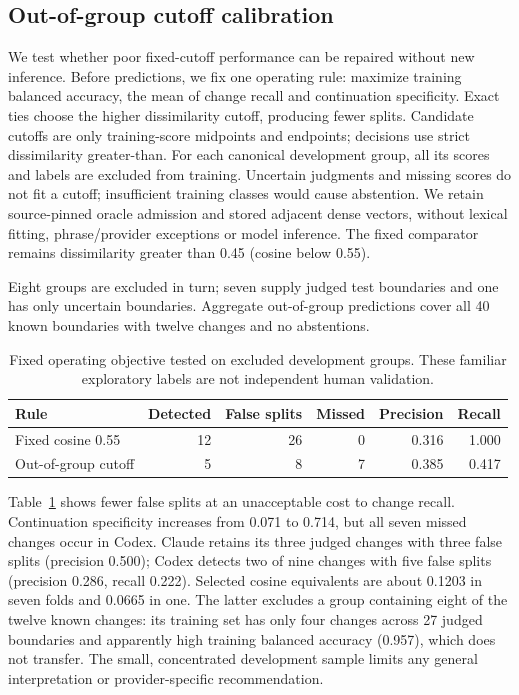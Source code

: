 \documentclass[11pt]{article}
\begin{document}
\subsection{Out-of-group cutoff calibration}
We test whether poor fixed-cutoff performance can be repaired without new
inference. Before predictions, we fix one operating rule: maximize training
balanced accuracy, the mean of change recall and continuation specificity.
Exact ties choose the higher dissimilarity cutoff, producing fewer splits.
Candidate cutoffs are only training-score midpoints and endpoints; decisions
use strict dissimilarity greater-than. For each canonical development group,
all its scores and labels are excluded from training. Uncertain judgments and
missing scores do not fit a cutoff; insufficient training classes would cause
abstention. We retain source-pinned oracle admission and stored adjacent dense
vectors, without lexical fitting, phrase/provider exceptions or model inference.
The fixed comparator remains dissimilarity greater than 0.45 (cosine below 0.55).

Eight groups are excluded in turn; seven supply judged test boundaries and one
has only uncertain boundaries. Aggregate out-of-group predictions cover all
40 known boundaries with twelve changes and no abstentions.
\begin{table}[ht]
\centering
\begin{tabular}{lrrrrr}
\toprule
Rule & Detected & False splits & Missed & Precision & Recall\\
\midrule
Fixed cosine 0.55 &12&26&0&0.316&1.000\\
Out-of-group cutoff &5&8&7&0.385&0.417\\
\bottomrule
\end{tabular}
\caption{Fixed operating objective tested on excluded development groups.
These familiar exploratory labels are not independent human validation.}
\label{tab:calibration}
\end{table}

Table~\ref{tab:calibration} shows fewer false splits at an unacceptable cost to
change recall. Continuation specificity increases from 0.071 to 0.714, but
all seven missed changes occur in Codex. Claude retains its three judged changes
with three false splits (precision 0.500); Codex detects two of nine changes with
five false splits (precision 0.286, recall 0.222). Selected cosine equivalents
are about 0.1203 in seven folds and 0.0665 in one. The latter excludes a group
containing eight of the twelve known changes: its training set has only four
changes across 27 judged boundaries and apparently high training balanced
accuracy (0.957), which does not transfer. The small, concentrated development
sample limits any general interpretation or provider-specific recommendation.
\end{document}
